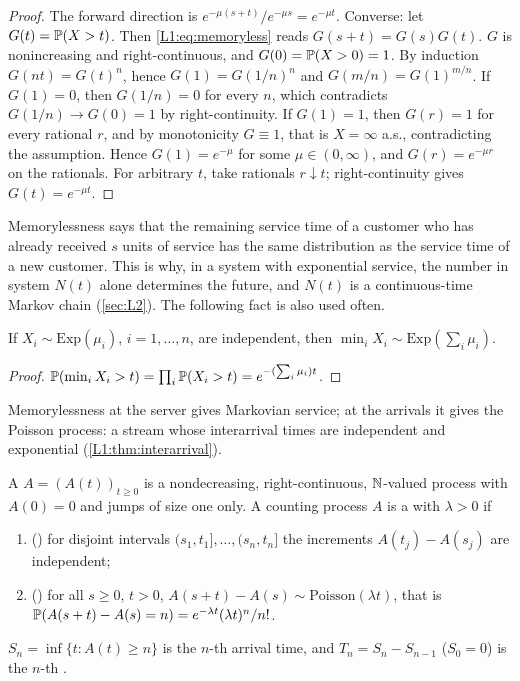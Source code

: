 \begin{proof}
The forward direction is $e^{-\mu(s+t)}/e^{-\mu s}=e^{-\mu t}$.
Converse: let $G(t)=\mathbb{P}(X>t)$. Then \eqref{L1:eq:memoryless} reads
$G(s+t)=G(s)G(t)$. $G$ is nonincreasing and right-continuous, and
$G(0)=\mathbb{P}(X>0)=1$. By induction $G(nt)=G(t)^n$, hence $G(1)=G(1/n)^n$ and
$G(m/n)=G(1)^{m/n}$.
If $G(1)=0$, then $G(1/n)=0$ for every $n$, which contradicts
$G(1/n)\to G(0)=1$ by right-continuity. If $G(1)=1$, then $G(r)=1$ for every
rational $r$, and by monotonicity $G\equiv1$, that is $X=\infty$ a.s., contradicting
the assumption. Hence $G(1)=e^{-\mu}$ for some $\mu\in(0,\infty)$, and
$G(r)=e^{-\mu r}$ on the rationals. For arbitrary $t$, take rationals $r\downarrow t$;
right-continuity gives $G(t)=e^{-\mu t}$.
\end{proof}

Memorylessness says that the remaining service time of a customer who has already
received $s$ units of service has the same distribution as the service time of a new
customer. This is why, in a system with exponential service, the number in system
$N(t)$ alone determines the future, and $N(t)$ is a continuous-time Markov chain
(\cref{sec:L2}). The following fact is also used often.

\begin{lemma}\label{L1:lem:min}
If $X_i\sim\mathrm{Exp}(\mu_i)$, $i=1,\dots,n$, are independent, then
$\min_iX_i\sim\mathrm{Exp}(\sum_i\mu_i)$.
\end{lemma}

\begin{proof}
$\mathbb{P}(\min_iX_i>t)=\prod_i\mathbb{P}(X_i>t)=e^{-(\sum_i\mu_i)t}$.
\end{proof}

Memorylessness at the server gives Markovian service; at the arrivals it gives the
Poisson process: a stream whose interarrival times are independent and exponential
(\cref{L1:thm:interarrival}).

\begin{definition}\label{def:poisson}
A  $A=(A(t))_{t\ge0}$ is a nondecreasing, right-continuous,
$\mathbb{N}$-valued process with $A(0)=0$ and jumps of size one only.
A counting process $A$ is a  with  $\lambda>0$ if
\begin{enumerate}
\item () for disjoint intervals
  $(s_1,t_1],\dots,(s_n,t_n]$ the increments $A(t_j)-A(s_j)$ are independent;
\item () for all $s\ge0$, $t>0$,
  $A(s+t)-A(s)\sim\mathrm{Poisson}(\lambda t)$, that is
  $\mathbb{P}(A(s+t)-A(s)=n)=e^{-\lambda t}(\lambda t)^n/n!$.
\end{enumerate}
$S_n=\inf\{t:A(t)\ge n\}$ is the $n$-th arrival time, and $T_n=S_n-S_{n-1}$
($S_0=0$) is the $n$-th .
\end{definition}

